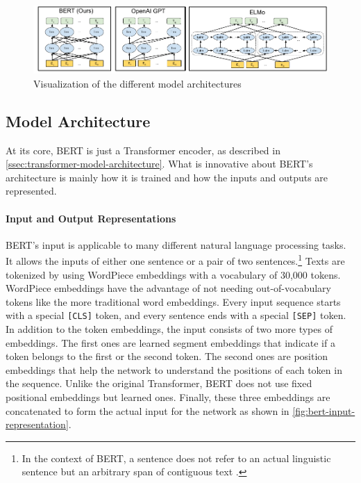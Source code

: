 \begin{figure}[h]
\centering
\includegraphics[width=0.7\paperwidth]{figures/bert-gpt2-elmo-model-comparison}
\caption[Visualization of the different model architectures]{Visualization of the different model architectures \cite[p.~13]{devlin2018bert}}
\label{fig:bert-gpt2-elmo-model-comparison}
\end{figure}

\subsection{Model Architecture}

At its core, BERT is just a Transformer encoder, as described in \cref{ssec:transformer-model-architecture}.
What is innovative about BERT's architecture is mainly how it is trained and how the inputs and outputs are represented.

\paragraph{Input and Output Representations}

BERT's input is applicable to many different natural language processing tasks.
It allows the inputs of either one sentence or a pair of two sentences.\footnote{In the context of BERT, a sentence does not refer to an actual linguistic sentence but an arbitrary span of contiguous text \cite[p.~4]{devlin2018bert}.}
Texts are tokenized by using WordPiece embeddings with a vocabulary of 30,000 tokens. 
WordPiece embeddings have the advantage of not needing out-of-vocabulary tokens like the more traditional word embeddings.
Every input sequence starts with a special \texttt{[CLS]} token, and every sentence ends with a special \texttt{[SEP]} token.
In addition to the token embeddings, the input consists of two more types of embeddings.
The first ones are learned segment embeddings that indicate if a token belongs to the first or the second token.
The second ones are position embeddings that help the network to understand the positions of each token in the sequence.
Unlike the original Transformer, BERT does not use fixed positional embeddings but learned ones.
Finally, these three embeddings are concatenated to form the actual input for the network as shown in \cref{fig:bert-input-representation}.

